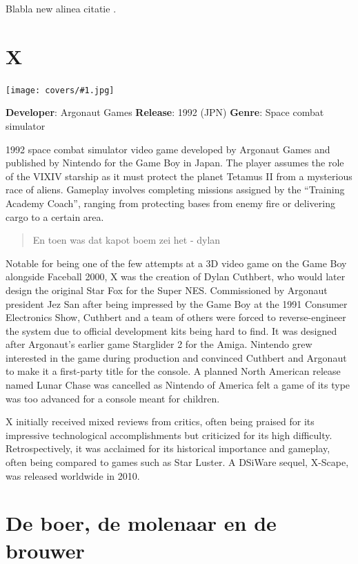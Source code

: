 \documentclass[
  english,
  symmetric,justified,marginals=raggedouter]{tufte-book}
\newcommand\cover[4]{
  \begin{marginfigure}[5cm] %
    \texttt{[image: covers/\#1.jpg]}
    \caption{\textbf{Developer}: #2 \newline \textbf{Release}: #3 \newline \textbf{Genre}: #4}
    \label{fig:marginfig}
  \end{marginfigure}  
}
\begin{document}
Blabla new alinea citatie \cite{dreyfus1980five}.

\mainmatter

\hypertarget{x}{%
\chapter{X}\label{x}}

\cover{x}{Argonaut Games}{1992 (JPN)}{Space combat simulator}

 1992 space combat simulator video game developed by Argonaut
Games and published by Nintendo for the Game Boy in Japan. The player
assumes the role of the VIXIV starship as it must protect the planet
Tetamus II from a mysterious race of aliens. Gameplay involves
completing missions assigned by the ``Training Academy Coach'', ranging
from protecting bases from enemy fire or delivering cargo to a certain
area.

\begin{quote}
En toen was dat kapot boem zei het - dylan
\end{quote}

Notable for being one of the few attempts at a 3D video game on the Game
Boy alongside Faceball 2000, X was the creation of Dylan Cuthbert, who
would later design the original Star Fox for the Super NES. Commissioned
by Argonaut president Jez San after being impressed by the Game Boy at
the 1991 Consumer Electronics Show, Cuthbert and a team of others were
forced to reverse-engineer the system due to official development kits
being hard to find. It was designed after Argonaut's earlier game
Starglider 2 for the Amiga. Nintendo grew interested in the game during
production and convinced Cuthbert and Argonaut to make it a first-party
title for the console. A planned North American release named Lunar
Chase was cancelled as Nintendo of America felt a game of its type was
too advanced for a console meant for children.

X initially received mixed reviews from critics, often being praised for
its impressive technological accomplishments but criticized for its high
difficulty. Retrospectively, it was acclaimed for its historical
importance and gameplay, often being compared to games such as Star
Luster. A DSiWare sequel, X-Scape, was released worldwide in 2010.

\hypertarget{de-boer-de-molenaar-en-de-brouwer}{%
\chapter{De boer, de molenaar en de
brouwer}\label{de-boer-de-molenaar-en-de-brouwer}}
\end{document}
